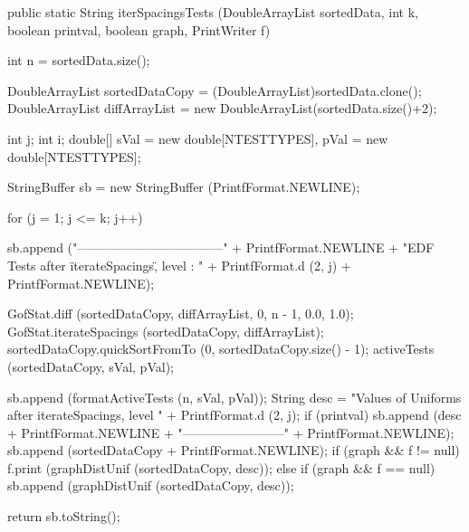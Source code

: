 \begin{htmlonly}
\end{htmlonly}
\begin{code}

   public static String iterSpacingsTests (DoubleArrayList sortedData, int k,
                                           boolean printval, boolean graph,
                                           PrintWriter f)\begin{hide} {

      int n = sortedData.size();

      DoubleArrayList sortedDataCopy = (DoubleArrayList)sortedData.clone();
      DoubleArrayList diffArrayList = new DoubleArrayList(sortedData.size()+2);

      int j;
      int i;
      double[] sVal = new double[NTESTTYPES], pVal = new double[NTESTTYPES];

      StringBuffer sb = new StringBuffer (PrintfFormat.NEWLINE);

      for (j = 1; j <= k; j++) {
         sb.append ("-----------------------------------" +
                     PrintfFormat.NEWLINE +
                     "EDF Tests after \"iterateSpacings\", level : " +
                     PrintfFormat.d (2, j) + PrintfFormat.NEWLINE);

         GofStat.diff (sortedDataCopy, diffArrayList, 0, n - 1, 0.0, 1.0);
         GofStat.iterateSpacings (sortedDataCopy, diffArrayList);
         sortedDataCopy.quickSortFromTo (0, sortedDataCopy.size() - 1);
         activeTests (sortedDataCopy, sVal, pVal);

         sb.append (formatActiveTests (n, sVal, pVal));
         String desc = "Values of Uniforms after iterateSpacings, level " +
             PrintfFormat.d (2, j);
         if (printval) {
          sb.append (desc + PrintfFormat.NEWLINE +
                     "------------------------" + PrintfFormat.NEWLINE);
          sb.append (sortedDataCopy + PrintfFormat.NEWLINE);
         }
         if (graph && f != null)
          f.print (graphDistUnif (sortedDataCopy, desc));
         else if (graph && f == null)
          sb.append (graphDistUnif (sortedDataCopy, desc));
       }
       return sb.toString();
   }\end{hide}
\end{code}
